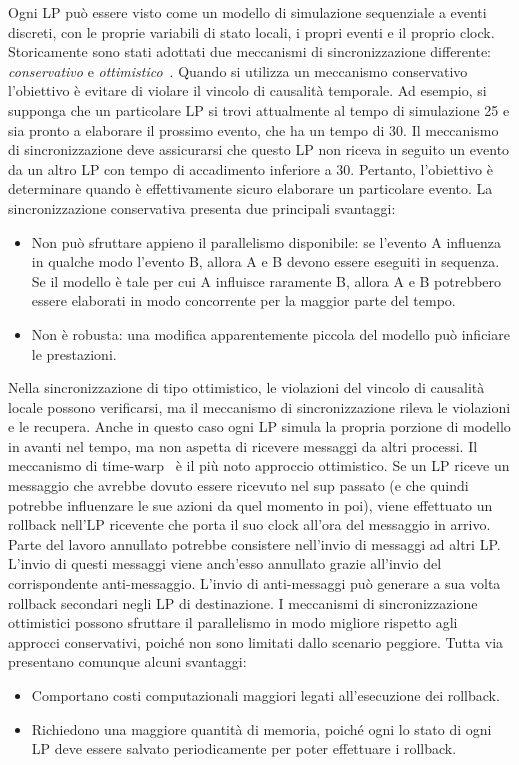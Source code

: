 \documentclass[12pt,a4paper,openright,twoside]{book}
\begin{document}
Ogni LP può essere visto come un modello di simulazione sequenziale a eventi discreti, con le proprie variabili di stato locali, i propri eventi e il proprio clock.
Storicamente sono stati adottati due meccanismi di sincronizzazione differente: \textit{conservativo} e \textit{ottimistico}~\cite{DBLP:conf/wsc/Fujimoto95}.
Quando si utilizza un meccanismo conservativo l'obiettivo è evitare di violare il vincolo di causalità temporale. Ad esempio, si supponga che un particolare LP si trovi attualmente al tempo di simulazione 25 e sia pronto a elaborare il prossimo evento, che ha un tempo di 30. Il meccanismo di sincronizzazione deve assicurarsi che questo LP non riceva in seguito un evento da un altro LP con tempo di accadimento inferiore a 30. Pertanto, l'obiettivo è determinare quando è effettivamente sicuro elaborare un particolare evento. 
La sincronizzazione conservativa presenta due principali svantaggi: 
\begin{itemize}
    \item Non può sfruttare appieno il parallelismo disponibile: se l'evento A influenza in qualche modo l'evento B, allora A e B devono essere eseguiti in sequenza. Se il modello è tale per cui A influisce raramente B, allora A e B potrebbero essere elaborati in modo concorrente per la maggior parte del tempo.
    \item Non è robusta: una modifica apparentemente piccola del modello può inficiare le prestazioni. 
\end{itemize}
Nella sincronizzazione di tipo ottimistico, le violazioni del vincolo di causalità locale possono verificarsi, ma il meccanismo di sincronizzazione rileva le violazioni e le recupera. Anche in questo caso ogni LP simula la propria porzione di modello in avanti nel tempo, ma non aspetta di ricevere messaggi da altri processi. 
Il meccanismo di time-warp~\cite{DBLP:journals/toplas/Jefferson85} è il più noto approccio ottimistico. Se un LP riceve un messaggio che avrebbe dovuto essere ricevuto nel sup passato (e che quindi potrebbe influenzare le sue azioni da quel momento in poi), viene effettuato un rollback nell'LP ricevente che porta il suo clock all'ora del messaggio in arrivo.
Parte del lavoro annullato potrebbe consistere nell'invio di messaggi ad altri LP. L'invio di questi messaggi viene anch'esso annullato grazie all'invio del corrispondente anti-messaggio. L'invio di anti-messaggi può generare a sua volta rollback secondari negli LP di destinazione.
I meccanismi di sincronizzazione ottimistici possono sfruttare il parallelismo in modo migliore rispetto agli approcci conservativi, poiché non sono limitati dallo scenario peggiore. Tutta via presentano comunque alcuni svantaggi: 
\begin{itemize}
    \item Comportano costi computazionali maggiori legati all'esecuzione dei rollback. 
    \item Richiedono una maggiore quantità di memoria, poiché ogni lo stato di ogni LP deve essere salvato periodicamente per poter effettuare i rollback.
\end{itemize}
\end{document}
